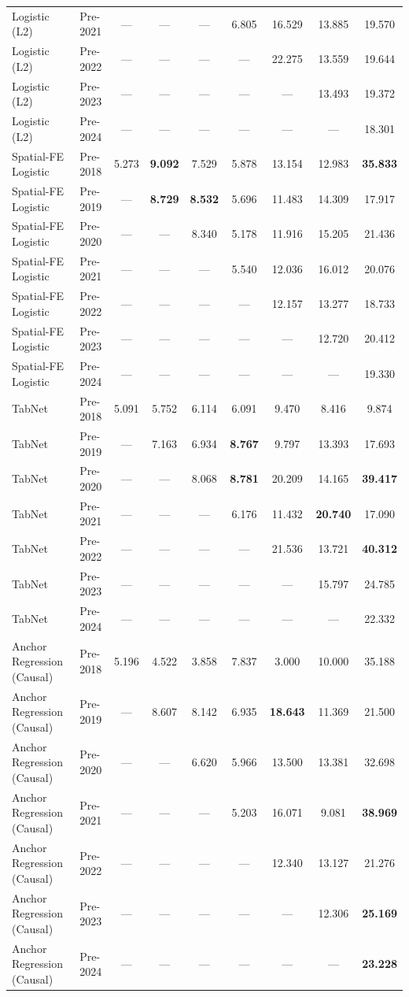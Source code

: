 \begin{table}[htbp]
{\begin{tabular}{l lccccccc}
Logistic (L2) & Pre-2021 & --- & --- & --- & 6.805 & 16.529 & 13.885 & 19.570 \\
Logistic (L2) & Pre-2022 & --- & --- & --- & --- & 22.275 & 13.559 & 19.644 \\
Logistic (L2) & Pre-2023 & --- & --- & --- & --- & --- & 13.493 & 19.372 \\
Logistic (L2) & Pre-2024 & --- & --- & --- & --- & --- & --- & 18.301 \\
Spatial-FE Logistic & Pre-2018 & 5.273 & \textbf{9.092} & 7.529 & 5.878 & 13.154 & 12.983 & \textbf{35.833} \\
Spatial-FE Logistic & Pre-2019 & --- & \textbf{8.729} & \textbf{8.532} & 5.696 & 11.483 & 14.309 & 17.917 \\
Spatial-FE Logistic & Pre-2020 & --- & --- & 8.340 & 5.178 & 11.916 & 15.205 & 21.436 \\
Spatial-FE Logistic & Pre-2021 & --- & --- & --- & 5.540 & 12.036 & 16.012 & 20.076 \\
Spatial-FE Logistic & Pre-2022 & --- & --- & --- & --- & 12.157 & 13.277 & 18.733 \\
Spatial-FE Logistic & Pre-2023 & --- & --- & --- & --- & --- & 12.720 & 20.412 \\
Spatial-FE Logistic & Pre-2024 & --- & --- & --- & --- & --- & --- & 19.330 \\
TabNet & Pre-2018 & 5.091 & 5.752 & 6.114 & 6.091 & 9.470 & 8.416 & 9.874 \\
TabNet & Pre-2019 & --- & 7.163 & 6.934 & \textbf{8.767} & 9.797 & 13.393 & 17.693 \\
TabNet & Pre-2020 & --- & --- & 8.068 & \textbf{8.781} & 20.209 & 14.165 & \textbf{39.417} \\
TabNet & Pre-2021 & --- & --- & --- & 6.176 & 11.432 & \textbf{20.740} & 17.090 \\
TabNet & Pre-2022 & --- & --- & --- & --- & 21.536 & 13.721 & \textbf{40.312} \\
TabNet & Pre-2023 & --- & --- & --- & --- & --- & 15.797 & 24.785 \\
TabNet & Pre-2024 & --- & --- & --- & --- & --- & --- & 22.332 \\
Anchor Regression (Causal) & Pre-2018 & 5.196 & 4.522 & 3.858 & 7.837 & 3.000 & 10.000 & 35.188 \\
Anchor Regression (Causal) & Pre-2019 & --- & 8.607 & 8.142 & 6.935 & \textbf{18.643} & 11.369 & 21.500 \\
Anchor Regression (Causal) & Pre-2020 & --- & --- & 6.620 & 5.966 & 13.500 & 13.381 & 32.698 \\
Anchor Regression (Causal) & Pre-2021 & --- & --- & --- & 5.203 & 16.071 & 9.081 & \textbf{38.969} \\
Anchor Regression (Causal) & Pre-2022 & --- & --- & --- & --- & 12.340 & 13.127 & 21.276 \\
Anchor Regression (Causal) & Pre-2023 & --- & --- & --- & --- & --- & 12.306 & \textbf{25.169} \\
Anchor Regression (Causal) & Pre-2024 & --- & --- & --- & --- & --- & --- & \textbf{23.228} \\
\bottomrule
\end{tabular}%
}
\end{table}
